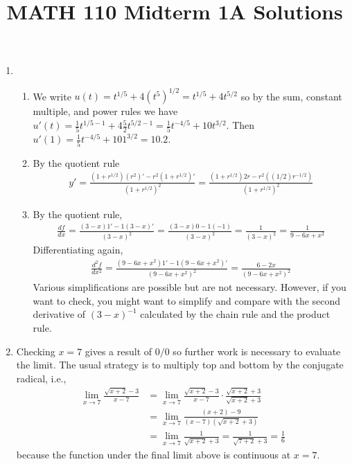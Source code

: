 \documentclass{article}
\title{MATH 110 Midterm 1A Solutions}
\author{\commonAuthor}
\date{\commonDateMTOne}
\newcommand{\ds}{\displaystyle}
\begin{document}
\maketitle
\begin{enumerate}
\item %
  \begin{enumerate}
  \item We write $u(t) = t^{1/5} + 4(t^5)^{1/2} = t^{1/5} + 4t^{5/2}$
    so by the sum, constant multiple, and power rules we have
    $\ds u'(t) = \frac{1}{5} t^{1/5 - 1} + 4 \frac{5}{2} t^{5/2-1}
    = \frac{1}{5} t^{-4/5} + 10 t^{3/2}$.  Then
    $u'(1) = \frac{1}{5} t^{-4/5} + 10 1^{3/2} = 10.2$.
  \item By the quotient rule
    \begin{align*}
      y' = \frac{(1+r^{1/2})(r^2)' - r^2(1+r^{1/2})'}{(1+r^{1/2})^2}
      = \frac{(1+r^{1/2})2r - r^2((1/2)r^{-1/2})}{(1+r^{1/2})^2}
    \end{align*}
  \item By the quotient rule,
    \begin{align*}
      \frac{df}{dx} = \frac{(3-x)1'-1(3-x)'}{(3-x)^2} 
      = \frac{(3-x)0 -1(-1)}{(3-x)^2} 
      = \frac{1}{(3-x)^2}
      = \frac{1}{9-6x+x^2}
    \end{align*}
    Differentiating again,
    \begin{align*}
      \frac{d^2f}{dx^2}
      = \frac{(9-6x+x^2) 1'- 1(9-6x+x^2)'}{(9-6x+x^2)^2}
      = \frac{6-2x}{(9-6x+x^2)^2}
    \end{align*}
    Various simplifications are possible but are not necessary.
    However, if you want to check,
    you might want to simplify and compare with the second derivative of
    $(3-x)^{-1}$ calculated by the chain rule and the product rule.
  \end{enumerate}
\item Checking $x=7$ gives a result of $0/0$ so further work is necessary
  to evaluate the limit.  The usual strategy is to multiply top
  and bottom by the conjugate radical, i.e.,
  \begin{align*}
    \lim_{x\to 7} \frac{\sqrt{x+2}-3}{x-7}
    &= \lim_{x\to 7} \frac{\sqrt{x+2}-3}{x-7} \cdot 
    \frac{\sqrt{x+2}+3}{\sqrt{x+2}+3}
    \\
    &= \lim_{x\to 7} \frac{(x+2)-9}{(x-7)(\sqrt{x+2}+3)}
    \\
    &= \lim_{x\to 7} \frac{1}{\sqrt{x+2}+3}
    = \frac{1}{\sqrt{7+2}+3} = \frac{1}{6}
  \end{align*}
  because the function under the final limit above is continuous at $x=7$.

\end{enumerate}
\end{document}
